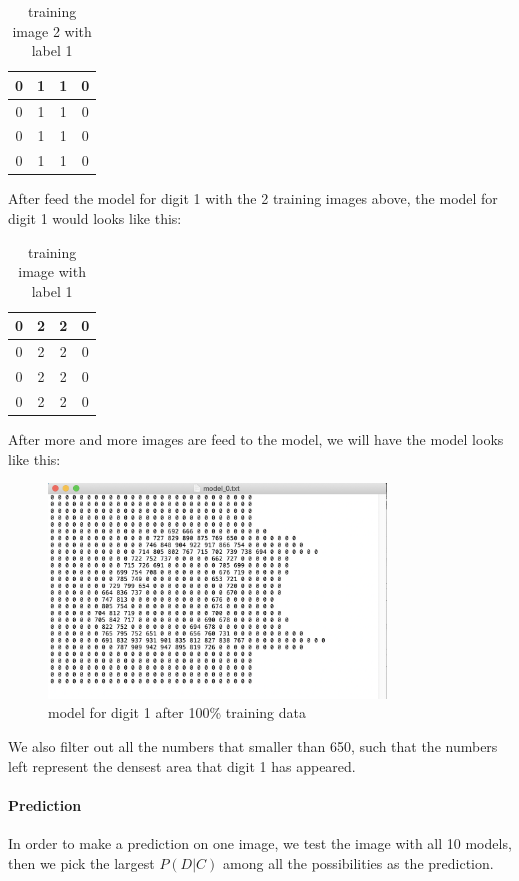\documentclass[11pt]{report}
\begin{document}
\begin{table}[h!]
\centering
\begin{tabular}{|c |c |c |c|} 
 \hline
0&1&1&0\\ 
 \hline
0&1&1&0\\ 
 \hline
0&1&1&0\\ 
 \hline
0&1&1&0\\ 
 \hline
\end{tabular}
\caption{training image 2 with label 1}
\end{table}

After feed the model for digit 1 with the 2 training images above, the model for digit 1 would looks like this:
\begin{table}[h!]
\centering
\begin{tabular}{|c |c |c |c|} 
 \hline
0&2&2&0\\ 
 \hline
0&2&2&0\\ 
 \hline
0&2&2&0\\ 
 \hline
0&2&2&0\\ 
 \hline
\end{tabular}
\caption{training image with label 1}
\end{table}

After more and more images are feed to the model, we will have the model looks like this:
\begin{figure}[h]
\begin{center}
\includegraphics[width = 0.8\textwidth]{Bayes_digit_1.png} 
\end{center}
\caption{model for digit 1 after 100\% training data}
\end{figure}

We also filter out all the numbers that smaller than 650, such that the numbers left represent the densest area that digit 1 has appeared. 
\newpage

\paragraph{Prediction}
In order to make a prediction on one image, we test the image with all 10 models, then we pick the largest $P(D|C)$ among all the possibilities as the prediction. \\
\end{document}
